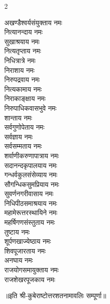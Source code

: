 \begin{multicols}{2}
\begin{flushleft}
अखण्डैश्वर्यसंयुक्ताय नमः\\
नित्यानन्दाय नमः\\
सुखाश्रयाय नमः\\
नित्यतृप्ताय नमः\\
निधित्रात्रे नमः\\
निराशाय नमः\\
निरुपद्रवाय नमः\\
नित्यकामाय नमः\\
निराकाङ्क्षाय नमः\\
निरुपाधिकवासभुवे नमः\hfill{}\\ %
शान्ताय नमः\\
सर्वगुणोपेताय नमः\\
सर्वज्ञाय नमः\\
सर्वसम्मताय नमः\\
शर्वाणीकरुणापात्राय नमः\\
सदानन्दकृपालयाय नमः\\
गन्धर्वकुलसंसेव्याय नमः\\
सौगन्धिकसुमप्रियाय नमः\\
सुवर्णनगरीवासाय नमः\\
निधिपीठसमाश्रयाय नमः\hfill{}\\ %
महामेरूत्तरस्थायिने नमः\\
महर्षिगणसंस्तुताय नमः\\
तुष्टाय नमः\\
शूर्पणखाज्येष्ठाय नमः\\
शिवपूजारताय नमः\\
अनघाय नमः\\
राजयोगसमायुक्ताय नमः\\
राजशेखरपूजकाय नमः\hfill{}\\ %
\end{flushleft}
\end{multicols}
॥इति श्री-कुबेराष्टोत्तरशतनामावलिः सम्पूर्णा॥
